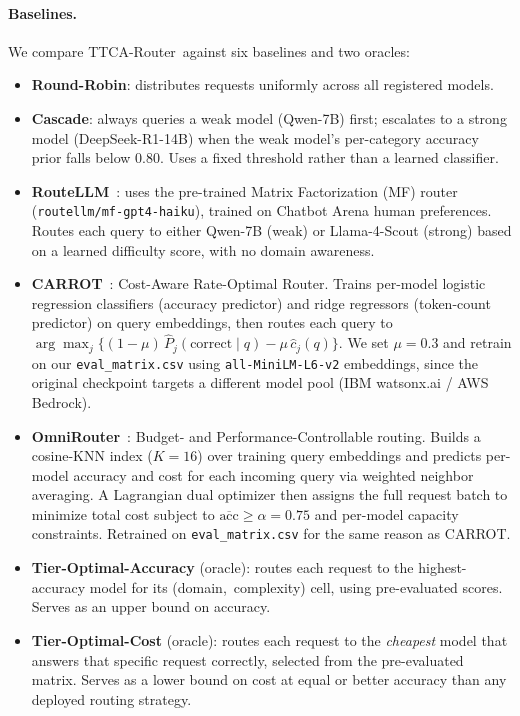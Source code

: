 \documentclass[11pt]{article}
\newcommand{\sysname}{TTCA-Router\xspace}
\begin{document}
\paragraph{Baselines.}
We compare \sysname\ against six baselines and two oracles:
\begin{itemize}
  \item \textbf{Round-Robin}: distributes requests uniformly across all
        registered models.
  \item \textbf{Cascade}: always queries a weak model (Qwen-7B) first;
        escalates to a strong model (DeepSeek-R1-14B) when the weak
        model's per-category accuracy prior falls below 0.80.
        Uses a fixed threshold rather than a learned classifier.
  \item \textbf{RouteLLM}~\cite{ong2024routellm}: uses the pre-trained
        Matrix Factorization (MF) router (\texttt{routellm/mf-gpt4-haiku}),
        trained on Chatbot Arena human preferences.
        Routes each query to either Qwen-7B (weak) or Llama-4-Scout (strong)
        based on a learned difficulty score, with no domain awareness.
  \item \textbf{CARROT}~\cite{somerstep2025carrot}: Cost-Aware Rate-Optimal
        Router.  Trains per-model logistic regression classifiers
        (accuracy predictor) and ridge regressors (token-count predictor)
        on query embeddings, then routes each query to
        $\arg\max_j\{(1-\mu)\,\hat{P}_j(\text{correct}\mid q) - \mu\,\hat{c}_j(q)\}$.
        We set $\mu{=}0.3$ and retrain on our \texttt{eval\_matrix.csv}
        using \texttt{all-MiniLM-L6-v2} embeddings, since the original
        checkpoint targets a different model pool (IBM watsonx.ai / AWS Bedrock).
  \item \textbf{OmniRouter}~\cite{mei2025omnirouter}: Budget- and
        Performance-Controllable routing.  Builds a cosine-KNN index ($K{=}16$)
        over training query embeddings and predicts per-model accuracy and cost
        for each incoming query via weighted neighbor averaging.
        A Lagrangian dual optimizer then assigns the full request batch to
        minimize total cost subject to $\overline{\text{acc}} \geq \alpha{=}0.75$
        and per-model capacity constraints.
        Retrained on \texttt{eval\_matrix.csv} for the same reason as CARROT.
  \item \textbf{Tier-Optimal-Accuracy} (oracle): routes each request to
        the highest-accuracy model for its \mbox{(domain, complexity)} cell,
        using pre-evaluated scores.
        Serves as an upper bound on accuracy.
  \item \textbf{Tier-Optimal-Cost} (oracle): routes each request to the
        \emph{cheapest} model that answers that specific request correctly,
        selected from the pre-evaluated matrix.
        Serves as a lower bound on cost at equal or better accuracy
        than any deployed routing strategy.
\end{itemize}
\end{document}
